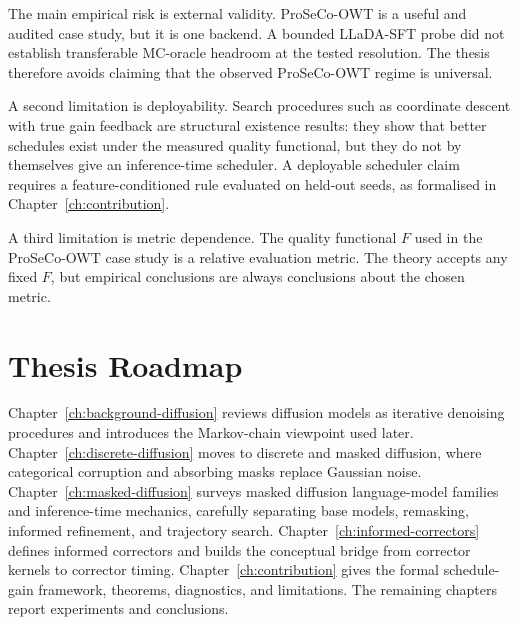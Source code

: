 The main empirical risk is external validity. ProSeCo-OWT is a useful and
audited case study, but it is one backend. A bounded LLaDA-SFT probe did not
establish transferable MC-oracle headroom at the tested resolution. The thesis
therefore avoids claiming that the observed ProSeCo-OWT regime is universal.

A second limitation is deployability. Search procedures such as coordinate
descent with true gain feedback are structural existence results: they show
that better schedules exist under the measured quality functional, but they do
not by themselves give an inference-time scheduler. A deployable scheduler
claim requires a feature-conditioned rule evaluated on held-out seeds, as
formalised in Chapter~\ref{ch:contribution}.

A third limitation is metric dependence. The quality functional $F$ used in
the ProSeCo-OWT case study is a relative evaluation metric. The theory accepts
any fixed $F$, but empirical conclusions are always conclusions about the
chosen metric.

\section{Thesis Roadmap}
\label{sec:ch1-roadmap}

Chapter~\ref{ch:background-diffusion} reviews diffusion models as iterative
denoising procedures and introduces the Markov-chain viewpoint used later.
Chapter~\ref{ch:discrete-diffusion} moves to discrete and masked diffusion,
where categorical corruption and absorbing masks replace Gaussian noise.
Chapter~\ref{ch:masked-diffusion} surveys masked diffusion language-model
families and inference-time mechanics, carefully separating base models,
remasking, informed refinement, and trajectory search. Chapter~\ref{ch:informed-correctors}
defines informed correctors and builds the conceptual bridge from corrector
kernels to corrector timing. Chapter~\ref{ch:contribution} gives the formal
schedule-gain framework, theorems, diagnostics, and limitations. The remaining
chapters report experiments and conclusions.
